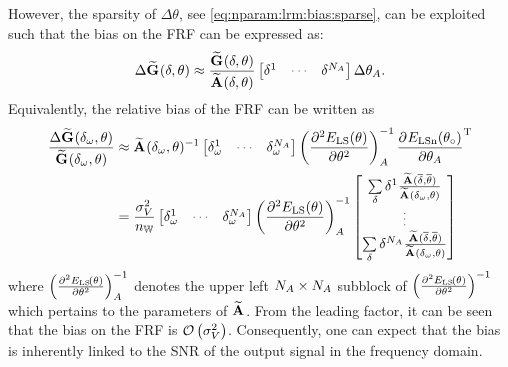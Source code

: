 However, the sparsity of $\Delta\theta$, see \eqref{eq:nparam:lrm:bias:sparse}, can be exploited such that the bias on the \gls{FRF} can be expressed as:
\begin{equation}
  \Delta \LocalModel{G}(\dW,\theta)
  \approx
  \frac{\LocalModel{G}(\dW, \theta)}
           {\LocalModel{A}(\dW, \theta)}
  \begin{bmatrix}
    \dW^1 & \deemph{\cdots} & \dW^{\order{A}}
  \end{bmatrix}
  \Delta \theta_A
  \text{.}
\end{equation}
Equivalently, the relative bias of the \gls{FRF} can be written as
\begin{align}
\frac{\Delta \LocalModel{G}(\dw{\omega}{}, \theta)}{\LocalModel{G}(\dw{\omega}{}, \theta)}
&\approx
\LocalModel{A}(\dw{\omega}{}, \theta)^{-1}
\begin{bmatrix}
    \dw{\omega}{}^1 & \deemph{\cdots} & \dw{\omega}{}^{\order{A}}
  \end{bmatrix}
  \left(  \PartialDerivative[2]{\ELSCost{\theta}}{ \theta^2 } \right)^{-1}_{A}
  \PartialDerivative{\ELSCost[n]{\true\theta}}{\theta_A}^{\TT}
  \\
  &=
  \frac{\sigma_V^2}{\nWind}
\begin{bmatrix}
    \dw{\omega}{}^1 & \deemph{\cdots} & \dw{\omega}{}^{\order{A}}
  \end{bmatrix}
  \left(  \PartialDerivative[2]{\ELSCost{\theta}}{ \theta^2 } \right)^{-1}_{A}
  \begin{bmatrix}
     \Sum_{\dW} \dW^1 
     \frac{\LocalModel{A}(\conj{\dW},\conj{\LocalVector{\theta}})}
               {\LocalModel{A}(\dw{\omega}{}, \theta)}\\
  \deemph{\vdots}\\
     \Sum_{\dW} \dW^{\order{A}} 
     \frac{\LocalModel{A}(\conj{\dW},\conj{\LocalVector{\theta}})}
               {\LocalModel{A}(\dw{\omega}{}, \theta)}\\
  \end{bmatrix}
\end{align}
where $\left(  \PartialDerivative[2]{\ELSCost{\theta}}{ \theta^2 } \right)^{-1}_{A}$ denotes the upper left $\order{A}\times\order{A}$ subblock of $\left(  \PartialDerivative[2]{\ELSCost{\theta}}{ \theta^2 } \right)^{-1}$ which pertains to the parameters of $\LocalModel{A}$.
From the leading factor, it can be seen that the bias on the \gls{FRF} is $\bigO{\sigma_V^2}$.
Consequently, one can expect that the bias is inherently linked to the \gls{SNR} of the output signal in the frequency domain.

